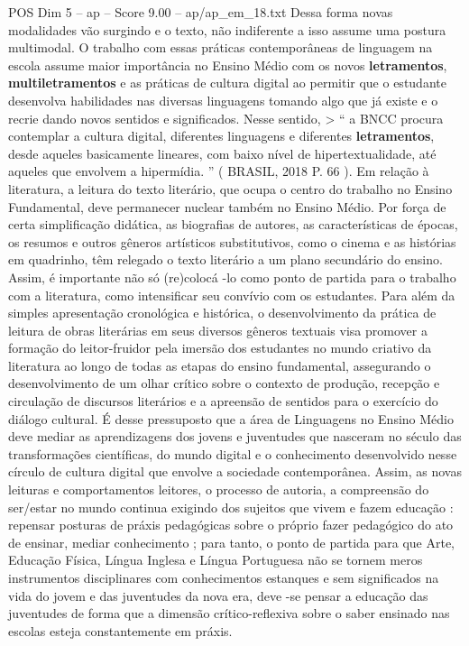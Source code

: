 \begin{textsample}{POS Dim 5 – ap – Score 9.00 – ap/ap\_em\_18.txt}
Dessa forma novas modalidades vão surgindo e o texto, não indiferente a isso assume uma postura multimodal.
O trabalho com essas práticas contemporâneas de linguagem na escola assume maior importância no Ensino Médio com os novos \textbf{letramentos}, \textbf{multiletramentos} e as práticas de cultura digital ao permitir que o estudante desenvolva habilidades nas diversas linguagens tomando algo que já existe e o recrie dando novos sentidos e significados.
Nesse sentido, > “ a BNCC procura contemplar a cultura digital, diferentes linguagens e diferentes \textbf{letramentos}, desde aqueles basicamente lineares, com baixo nível de hipertextualidade, até aqueles que envolvem a hipermídia. ” ( BRASIL, 2018 P. 66 ).
Em relação à literatura, a leitura do texto literário, que ocupa o centro do trabalho no Ensino Fundamental, deve permanecer nuclear também no Ensino Médio.
Por força de certa simplificação didática, as biografias de autores, as características de épocas, os resumos e outros gêneros artísticos substitutivos, como o cinema e as histórias em quadrinho, têm relegado o texto literário a um plano secundário do ensino.
Assim, é importante não só (re)colocá -lo como ponto de partida para o trabalho com a literatura, como intensificar seu convívio com os estudantes.
Para além da simples apresentação cronológica e histórica, o desenvolvimento da prática de leitura de obras literárias em seus diversos gêneros textuais visa promover a formação do leitor-fruidor pela imersão dos estudantes no mundo criativo da literatura ao longo de todas as etapas do ensino fundamental, assegurando o desenvolvimento de um olhar crítico sobre o contexto de produção, recepção e circulação de discursos literários e a apreensão de sentidos para o exercício do diálogo cultural.
É desse pressuposto que a área de Linguagens no Ensino Médio deve mediar as aprendizagens dos jovens e juventudes que nasceram no século das transformações científicas, do mundo digital e o conhecimento desenvolvido nesse círculo de cultura digital que envolve a sociedade contemporânea.
Assim, as novas leituras e comportamentos leitores, o processo de autoria, a compreensão do ser/estar no mundo continua exigindo dos sujeitos que vivem e fazem educação : repensar posturas de práxis pedagógicas sobre o próprio fazer pedagógico do ato de ensinar, mediar conhecimento ; para tanto, o ponto de partida para que Arte, Educação Física, Língua Inglesa e Língua Portuguesa não se tornem meros instrumentos disciplinares com conhecimentos estanques e sem significados na vida do jovem e das juventudes da nova era, deve -se pensar a educação das juventudes de forma que a dimensão crítico-reflexiva sobre o saber ensinado nas escolas esteja constantemente em práxis.

\end{textsample}
